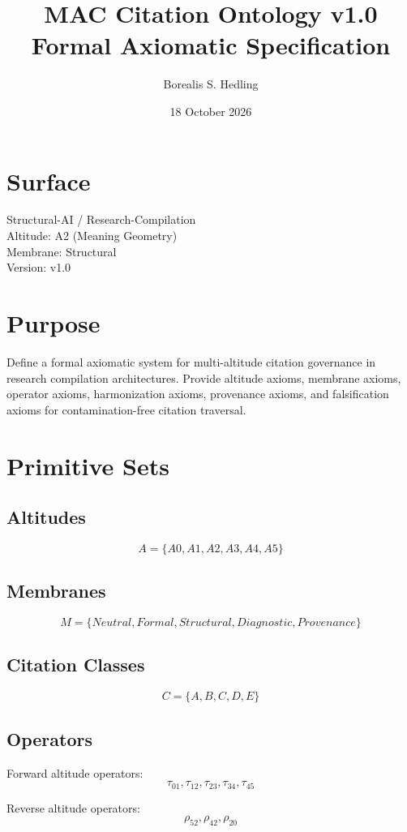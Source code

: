 \documentclass[11pt]{article}
\title{MAC Citation Ontology v1.0 \\ Formal Axiomatic Specification}
\author{Borealis S. Hedling}
\date{18 October 2026}
\begin{document}
\maketitle

\section*{Surface}
Structural-AI / Research-Compilation \\
Altitude: A2 (Meaning Geometry) \\
Membrane: Structural \\
Version: v1.0

\section{Purpose}
Define a formal axiomatic system for multi-altitude citation governance in
research compilation architectures. Provide altitude axioms, membrane axioms,
operator axioms, harmonization axioms, provenance axioms, and falsification
axioms for contamination-free citation traversal.

\section{Primitive Sets}

\subsection{Altitudes}
\[
A = \{A0, A1, A2, A3, A4, A5\}
\]

\subsection{Membranes}
\[
M = \{Neutral, Formal, Structural, Diagnostic, Provenance\}
\]

\subsection{Citation Classes}
\[
C = \{A, B, C, D, E\}
\]

\subsection{Operators}
Forward altitude operators:
\[
\tau_{01}, \tau_{12}, \tau_{23}, \tau_{34}, \tau_{45}
\]

Reverse altitude operators:
\[
\rho_{52}, \rho_{42}, \rho_{20}
\]
\end{document}
